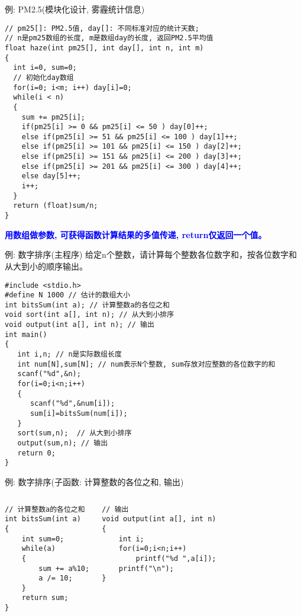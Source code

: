 \begin{frame}{例: PM2.5(模块化设计, 雾霾统计信息)}
\vspace{-0.2cm}
\begin{lstlisting}
// pm25[]: PM2.5值, day[]: 不同标准对应的统计天数; 
// n是pm25数组的长度, m是数组day的长度, 返回PM2.5平均值
float haze(int pm25[], int day[], int n, int m)
{
  int i=0, sum=0;
  // 初始化day数组
  for(i=0; i<m; i++) day[i]=0;
  while(i < n) 
  {
    sum += pm25[i];
    if(pm25[i] >= 0 && pm25[i] <= 50 ) day[0]++;
    else if(pm25[i] >= 51 && pm25[i] <= 100 ) day[1]++;
    else if(pm25[i] >= 101 && pm25[i] <= 150 ) day[2]++;
    else if(pm25[i] >= 151 && pm25[i] <= 200 ) day[3]++;
    else if(pm25[i] >= 201 && pm25[i] <= 300 ) day[4]++;
    else day[5]++;
    i++;
  } 
  return (float)sum/n;
} 
\end{lstlisting}
\textbf{\textcolor{blue}{用数组做参数, 可获得函数计算结果的多值传递, return仅返回一个值。}}
\end{frame}

\begin{frame}{例: 数字排序(主程序)}
给定n个整数，请计算每个整数各位数字和，按各位数字和从大到小的顺序输出。
\begin{lstlisting}
#include <stdio.h>
#define N 1000 // 估计的数组大小
int bitsSum(int a); // 计算整数a的各位之和
void sort(int a[], int n); // 从大到小排序
void output(int a[], int n); // 输出
int main()
{
   int i,n; // n是实际数组长度 
   int num[N],sum[N]; // num表示N个整数, sum存放对应整数的各位数字的和  
   scanf("%d",&n);
   for(i=0;i<n;i++) 
   {
      scanf("%d",&num[i]); 
      sum[i]=bitsSum(num[i]);
   }
   sort(sum,n);  // 从大到小排序
   output(sum,n); // 输出
   return 0;
}
\end{lstlisting}
\end{frame}

\begin{frame}{例: 数字排序(子函数: 计算整数的各位之和, 输出)}
\begin{columns}[T]
\begin{lstlisting}
// 计算整数a的各位之和
int bitsSum(int a)
{
	int sum=0;
	while(a)
	{
		sum += a%10;
		a /= 10;
	}
	return sum;
}
\end{lstlisting}
\begin{lstlisting}[frame=leftline]
// 输出
void output(int a[], int n)
{
	int i;
	for(i=0;i<n;i++) 
		printf("%d ",a[i]);
	printf("\n");
}
\end{lstlisting}
\end{columns}
\end{frame}

